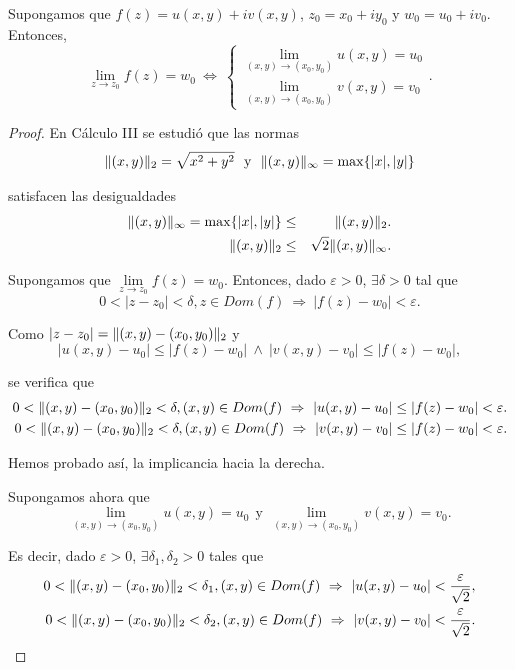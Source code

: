 \begin{propo} \label{LimitesParteRealIm}
Supongamos que $f(z) = u(x,y) +i v(x,y)$, $z_0 = x_0 +iy_0$ y $w_0 = u_0 +iv_0$. Entonces,
$$\lim_{z \to z_0} f(z) = w_0 ~\Leftrightarrow~ \left\{ \begin{array}{c}
\lim\limits_{(x,y) \to (x_0,y_0)} u(x,y) = u_0 \\
\lim\limits_{(x,y) \to (x_0,y_0)} v(x,y) = v_0
\end{array} \right. .$$
\end{propo}

\begin{proof}
En Cálculo III se estudió que las normas 
$$\lVert(x,y)\rVert_2 = \sqrt{x^2+ y^2}~~\mbox{y}~~\lVert(x,y)\rVert_{\infty} = \max\{|x|,|y|\}$$

satisfacen las desigualdades
\begin{eqnarray}
\lVert(x,y)\rVert_{\infty} = \max\{|x|,|y|\} &\leq & \lVert(x,y)\rVert_2. \label{limite1} \\
\lVert(x,y)\rVert_2 &\leq & \sqrt{2} \lVert(x,y)\rVert_{\infty}.\label{limite2}
\end{eqnarray} 

Supongamos que $\lim\limits_{z \to z_0} f(z) = w_0$. Entonces, dado $\varepsilon > 0$, $\exists \delta > 0$ tal que
$$0< |z-z_0| < \delta, z \in Dom(f) ~\Rightarrow ~ |f(z)-w_0| < \varepsilon. $$

Como $|z-z_0| = \lVert(x,y) - (x_0,y_0)\rVert_2$ y 
$$|u(x,y) - u_0| \leq |f(z) - w_0| ~\wedge~|v(x,y) - v_0| \leq |f(z) - w_0|, $$

se verifica que
\begin{eqnarray*}
0< \lVert(x,y) - (x_0,y_0)\rVert_2 < \delta, (x,y) \in Dom(f) ~\Rightarrow ~ |u(x,y) - u_0| \leq |f(z) - w_0| < \varepsilon . \\
0< \lVert(x,y) - (x_0,y_0)\rVert_2 < \delta, (x,y) \in Dom(f) ~\Rightarrow ~ |v(x,y) - v_0| \leq |f(z) - w_0| < \varepsilon . 
\end{eqnarray*}

Hemos probado así, la implicancia hacia la derecha.

Supongamos ahora que
$$\lim_{(x,y) \to (x_0,y_0)} u(x,y) = u_0  ~~\mbox{y}~~\lim_{(x,y) \to (x_0,y_0)} v(x,y) = v_0.$$

Es decir, dado $\varepsilon >0$, $\exists \delta_1, \delta_2 >0$ tales que
\begin{eqnarray*}
0< \lVert(x,y) - (x_0,y_0)\rVert_2 < \delta_1 , (x,y) \in Dom(f) ~\Rightarrow ~ |u(x,y) - u_0| < \frac{\varepsilon}{\sqrt{2}}, \\
0< \lVert(x,y) - (x_0,y_0)\rVert_2 < \delta_2 , (x,y) \in Dom(f) ~\Rightarrow ~ |v(x,y) - v_0|  < \frac{\varepsilon}{\sqrt{2}} . 
\end{eqnarray*}


\end{proof}
